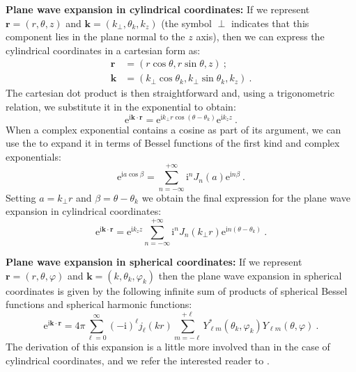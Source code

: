 \noindent\textbf{Plane wave expansion in cylindrical coordinates:}  If we represent $\mathbf{r}=(r,\theta,z)$ and $\mathbf{k}=(k_{\perp},\theta_k,k_z)$ (the symbol $\perp$ indicates that this component lies in the plane normal to the $z$ axis), then we can express the cylindrical coordinates in a cartesian form as:
\begin{equation*}
\begin{split}
	\mathbf{r} &= (r\cos\theta, r\sin\theta,z)\ ;\\
	\mathbf{k} &= (k_{\perp}\cos\theta_k, k_{\perp}\sin\theta_k,k_z)\ .
\end{split}
\end{equation*}
The cartesian dot product is then straightforward and, using a trigonometric relation, we substitute it in the exponential to obtain:
\[
	\mathrm{e}^{\mathrm{i}\mathbf{k}\cdot\mathbf{r}} =  \mathrm{e}^{\mathrm{i}k_{\perp}r\cos(\theta-\theta_k)} \mathrm{e}^{\mathrm{i}k_zz}\ .
\]
When a complex exponential contains a cosine as part of its argument, we can use the  to expand it in terms of Bessel functions of the first kind and complex exponentials:
\begin{equation}
	\mathrm{e}^{\mathrm{i}a\cos\beta} = \sum_{n=-\infty}^{+\infty} \mathrm{i}^n J_n(a)\mathrm{e}^{\mathrm{i}n\beta}\ .\label{\chabbr:eq:JacobiAnger}
\end{equation}
Setting $a=k_{\perp}r$ and $\beta=\theta-\theta_k$ we obtain the final expression for the plane wave expansion in cylindrical coordinates:
\begin{equation}
	\mathrm{e}^{\mathrm{i}\mathbf{k}\cdot\mathbf{r}} = \mathrm{e}^{\mathrm{i}k_zz}\sum_{n=-\infty}^{+\infty} \mathrm{i}^n J_n(k_{\perp}r)\mathrm{e}^{\mathrm{i}n(\theta-\theta_k)}\ .\label{\chabbr:eq:PWcylindrical}
\end{equation}

\noindent\textbf{Plane wave expansion in spherical coordinates:}  If we represent $\mathbf{r}=(r,\theta,\varphi)$ and $\mathbf{k}=(k,\theta_k,\varphi_k)$ then the plane wave expansion in spherical coordinates is given by the following infinite sum of products of spherical Bessel functions and spherical harmonic functions:
\begin{equation}
	\mathrm{e}^{\mathrm{i}\mathbf{k}\cdot\mathbf{r}}= 4\pi\sum_{\ell=0}^{\infty}(\mathrm{-i})^{\ell} j_{\ell}(kr)\sum_{m=-\ell}^{+\ell} Y^{\ast}_{\ell m}(\theta_k,\varphi_k)Y_{\ell m}(\theta,\varphi)\ .\label{\chabbr:eq:PWspherical}
\end{equation}
The derivation of this expansion is a little more involved than in the case of cylindrical coordinates, and we refer the interested reader to \cite{jackson1998a}.



